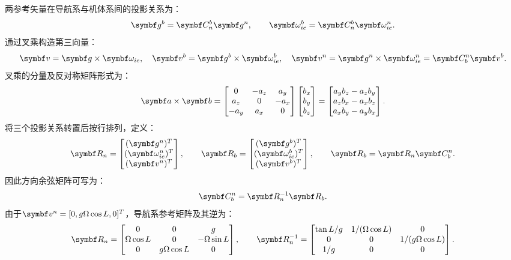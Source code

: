 两参考矢量在导航系与机体系间的投影关系为：
\begin{equation}
\matr g^b=\matr C_n^b\matr g^n,\qquad
\matr\omega_{ie}^b=\matr C_n^b\matr\omega_{ie}^n.
\label{eq:vectorprojection}\end{equation}
通过叉乘构造第三向量：
\begin{equation}
\matr v=\matr g\times\matr\omega_{ie},\quad
\matr v^b=\matr g^b\times\matr\omega_{ie}^b,\quad
\matr v^n=\matr g^n\times\matr\omega_{ie}^n=\matr C_b^n\matr v^b.
\label{eq:thirdvector}\end{equation}
叉乘的分量及反对称矩阵形式为：
\begin{equation}
\matr a\times\matr b=
\begin{bmatrix}0&-a_z&a_y\\a_z&0&-a_x\\-a_y&a_x&0\end{bmatrix}
\begin{bmatrix}b_x\\b_y\\b_z\end{bmatrix}
=\begin{bmatrix}a_yb_z-a_zb_y\\a_zb_x-a_xb_z\\a_xb_y-a_yb_x\end{bmatrix}.
\end{equation}
将三个投影关系转置后按行排列，定义：
\begin{equation}
\matr R_n=\begin{bmatrix}(\matr g^n)^T\\(\matr\omega_{ie}^n)^T\\(\matr v^n)^T\end{bmatrix},\qquad
\matr R_b=\begin{bmatrix}(\matr g^b)^T\\(\matr\omega_{ie}^b)^T\\(\matr v^b)^T\end{bmatrix},\qquad
\matr R_b=\matr R_n\matr C_b^n.
\end{equation}
因此方向余弦矩阵可写为：
\begin{equation}
\matr C_b^n=\matr R_n^{-1}\matr R_b.
\label{eq:directtriad}\end{equation}
由于$\matr v^n=[0,g\Omega\cos L,0]^T$，导航系参考矩阵及其逆为：
\begin{equation}
\matr R_n=\begin{bmatrix}
0&0&g\\\Omega\cos L&0&-\Omega\sin L\\0&g\Omega\cos L&0
\end{bmatrix},\qquad
\matr R_n^{-1}=\begin{bmatrix}
\tan L/g&1/(\Omega\cos L)&0\\
0&0&1/(g\Omega\cos L)\\1/g&0&0
\end{bmatrix}.
\label{eq:referenceinverse}\end{equation}
